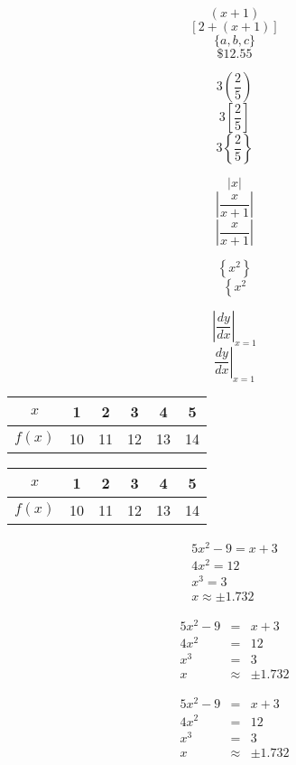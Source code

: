 \documentclass[11pt]{article}
\begin{document}
$$(x+1)$$
$$[2+(x+1)]$$
$$\{a,b,c\}$$
$$\$12.55$$

$$3\left(\frac{2}{5}\right)$$
$$3\left[\frac{2}{5}\right]$$
$$3\left\{\frac{2}{5}\right\}$$

$$|x|$$
$$|\frac{x}{x+1}|$$
$$\left|\frac{x}{x+1}\right|$$

$$\left\{x^2\right\}$$
$$\left\{x^2\right.$$

$$\left| \frac{dy}{dx} \right|_{x=1}$$
$$\left. \frac{dy}{dx} \right|_{x=1}$$

\begin{tabular}{cccccc} %
$x$ & 1 & 2 & 3 & 4 & 5 \\ \hline
$f(x)$ & 10 & 11 & 12 & 13 & 14

\end{tabular}

\begin{tabular}{|c|c|c|c|c|c|} %
\hline
$x$ & 1 & 2 & 3 & 4 & 5 \\ \hline
$f(x)$ & 10 & 11 & 12 & 13 & 14 \\ \hline
\end{tabular}

\begin{eqnarray}
5x^2-9=x+3 \\
4x^2=12 \\
x^3=3 \\
x \approx \pm 1.732
\end{eqnarray}

\begin{eqnarray}
5x^2-9&=&x+3 \\
4x^2&=&12 \\
x^3&=&3 \\
x &\approx& \pm 1.732
\end{eqnarray}

\begin{eqnarray*}
5x^2-9&=&x+3 \\
4x^2&=&12 \\
x^3&=&3 \\
x &\approx& \pm 1.732
\end{eqnarray*}
\end{document}

